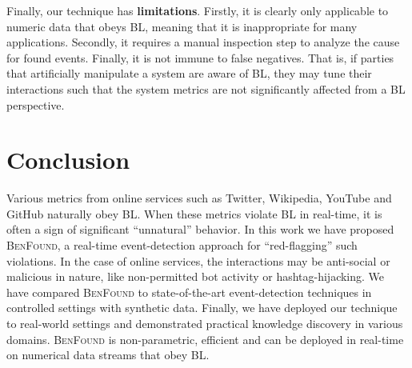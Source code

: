 \documentclass[twoside,leqno,twocolumn]{article}\usepackage[]{graphicx}\usepackage[]{color}
\newcommand{\algoname}{\textsc{BenFound}}
\begin{document}



Finally, our technique has \textbf{limitations}. Firstly, it is clearly only applicable to numeric data that obeys BL, meaning that it is inappropriate for many applications. Secondly, it requires a manual inspection step to analyze the cause for found events. Finally, it is not immune to false negatives. That is, if parties that artificially manipulate a system are aware of BL, they may tune their interactions such that the system metrics are not significantly affected from a BL perspective.

\section{Conclusion}

Various metrics from online services such as Twitter, Wikipedia, YouTube and GitHub naturally obey BL. When these metrics violate BL in real-time, it is often a sign of significant ``unnatural'' behavior. In this work we have proposed \algoname{}, a real-time event-detection approach for ``red-flagging'' such violations. In the case of online services, the interactions may be anti-social or malicious in nature, like non-permitted bot activity or hashtag-hijacking. We have compared \algoname{} to state-of-the-art event-detection techniques in controlled settings with synthetic data. Finally, we have deployed our technique to real-world settings and demonstrated practical knowledge discovery in various domains. \algoname{} is non-parametric, efficient and can be deployed in real-time on numerical data streams that obey BL.
\end{document}
